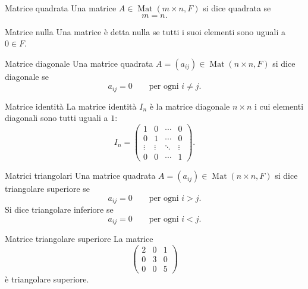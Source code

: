 \documentclass[a4paper]{article}
\begin{document}
\begin{snippetdefinition}{Matrice quadrata}
    Una matrice \(A\in\operatorname{Mat}(m\times n,F)\) si dice quadrata se
    \[
        m=n.
    \]
\end{snippetdefinition}

\begin{snippetdefinition}{Matrice nulla}
    Una matrice è detta nulla se tutti i suoi elementi sono uguali a \(0\in F\).
\end{snippetdefinition}

\begin{snippetdefinition}{Matrice diagonale}
    Una matrice quadrata \(A=(a_{ij})\in\operatorname{Mat}(n\times n,F)\) si dice diagonale se
    \[
        a_{ij}=0
        \qquad
        \text{per ogni } i\neq j.
    \]
\end{snippetdefinition}

\begin{snippetdefinition}{Matrice identità}
    La matrice identità \(I_n\) è la matrice diagonale \(n\times n\) i cui elementi diagonali sono tutti uguali a \(1\):
    \[
        I_n=
        \begin{pmatrix}
            1 & 0 & \cdots & 0\\
            0 & 1 & \cdots & 0\\
            \vdots & \vdots & \ddots & \vdots\\
            0 & 0 & \cdots & 1
        \end{pmatrix}.
    \]
\end{snippetdefinition}

\begin{snippetdefinition}{Matrici triangolari}
    Una matrice quadrata \(A=(a_{ij})\in\operatorname{Mat}(n\times n,F)\) si dice triangolare superiore se
    \[
        a_{ij}=0
        \qquad
        \text{per ogni } i>j.
    \]
    Si dice triangolare inferiore se
    \[
        a_{ij}=0
        \qquad
        \text{per ogni } i<j.
    \]
\end{snippetdefinition}

\begin{snippetexample}{Matrice triangolare superiore}
    La matrice
    \[
        \begin{pmatrix}
            2 & 0 & 1\\
            0 & 3 & 0\\
            0 & 0 & 5
        \end{pmatrix}
    \]
    è triangolare superiore.
\end{snippetexample}
\end{document}
